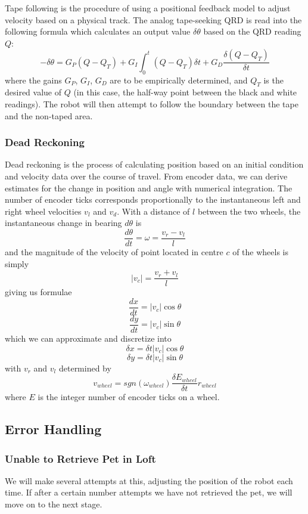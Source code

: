 \documentclass[11pt, oneside]{article} %
\begin{document}
		Tape following is the procedure of using a positional feedback model to adjust velocity based on a physical track. The analog tape-seeking QRD is read into the following formula which calculates an output value $\delta\theta$ based on the QRD reading $Q$:
		$$-\delta\theta = G_P (Q - Q_T) + G_I \int_{0}^{t} (Q - Q_T) \delta t + G_D \frac{\delta (Q - Q_T)}{\delta t}$$
		where the gains $G_P$, $G_I$, $G_D$ are to be empirically determined, and $Q_T$ is the desired value of $Q$ (in this case, the half-way point between the black and white readings). The robot will then attempt to follow the boundary between the tape and the non-taped area.
		
		\subsubsection{Dead Reckoning}
		
		Dead reckoning is the process of calculating position based on an initial condition and velocity data over the course of travel. From encoder data, we can derive estimates for the change in position and angle with numerical integration. The number of encoder ticks corresponds proportionally to the instantaneous left and right wheel velocities $v_l$ and $v_d$. With a distance of $l$ between the two wheels, the instantaneous change in bearing $d\theta$ is
		$$\frac{d\theta}{dt} = \omega = \frac{v_r - v_l}{l}$$
		and the magnitude of the velocity of point located in centre $c$ of the wheels is simply
		$$\left|v_c\right| = \frac{v_r + v_l}{l}$$
		giving us formulae
		$$\frac{dx}{dt} = \left|v_c\right| \cos{\theta}$$
		$$\frac{dy}{dt} = \left|v_c\right| \sin{\theta}$$
		which we can approximate and discretize into
		$$\delta x = \delta t \left|v_c\right| \cos{\theta}$$
		$$\delta y = \delta t \left|v_c\right| \sin{\theta}$$
		with $v_r$ and $v_l$ determined by
		$$v_{wheel} = sgn(\omega_{wheel}) \frac{\delta E_{wheel}}{\delta t} r_{wheel} $$
		where $E$ is the integer number of encoder ticks on a wheel.

	\subsection{Error Handling}
		\subsubsection{Unable to Retrieve Pet in Loft}
		We will make several attempts at this, adjusting the position of the robot each time. If after a certain number attempts we have not retrieved the pet, we will move on to the next stage.
\end{document}
